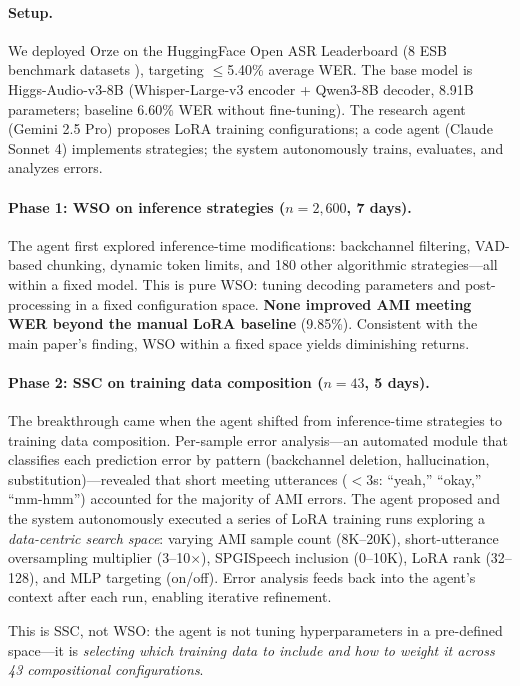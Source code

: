 \documentclass{article}
\begin{document}
\paragraph{Setup.}
We deployed Orze on the HuggingFace Open ASR Leaderboard (8 ESB benchmark datasets \citep{gandhi2022esb}), targeting $\leq$5.40\% average WER.
The base model is Higgs-Audio-v3-8B (Whisper-Large-v3 encoder + Qwen3-8B decoder, 8.91B parameters; baseline 6.60\% WER without fine-tuning).
The research agent (Gemini 2.5 Pro) proposes LoRA training configurations; a code agent (Claude Sonnet 4) implements strategies; the system autonomously trains, evaluates, and analyzes errors.

\paragraph{Phase 1: WSO on inference strategies ($n = 2{,}600$, 7 days).}
The agent first explored inference-time modifications: backchannel filtering, VAD-based chunking, dynamic token limits, and 180 other algorithmic strategies---all within a fixed model.
This is pure WSO: tuning decoding parameters and post-processing in a fixed configuration space.
\textbf{None improved AMI meeting WER beyond the manual LoRA baseline} (9.85\%).
Consistent with the main paper's finding, WSO within a fixed space yields diminishing returns.

\paragraph{Phase 2: SSC on training data composition ($n = 43$, 5 days).}
The breakthrough came when the agent shifted from inference-time strategies to training data composition.
Per-sample error analysis---an automated module that classifies each prediction error by pattern (backchannel deletion, hallucination, substitution)---revealed that short meeting utterances ($<$3s: ``yeah,'' ``okay,'' ``mm-hmm'') accounted for the majority of AMI errors.
The agent proposed and the system autonomously executed a series of LoRA training runs exploring a \emph{data-centric search space}: varying AMI sample count (8K--20K), short-utterance oversampling multiplier (3--10$\times$), SPGISpeech inclusion (0--10K), LoRA rank (32--128), and MLP targeting (on/off).
Error analysis feeds back into the agent's context after each run, enabling iterative refinement.

This is SSC, not WSO: the agent is not tuning hyperparameters in a pre-defined space---it is \emph{selecting which training data to include and how to weight it across 43 compositional configurations}.
\end{document}
